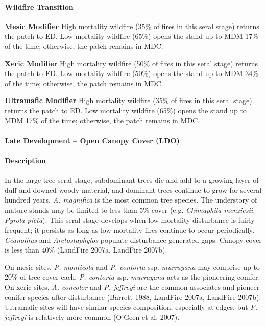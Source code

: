 \paragraph{Wildfire Transition}
\begin{adjustwidth}{2cm}{}
\noindent \textbf{Mesic Modifier } High mortality wildfire (35\% of fires in this seral stage) returns the patch to ED. Low mortality wildfire (65\%) opens the stand up to MDM 17\% of the time; otherwise, the patch remains in MDC. 

\medskip
\noindent \textbf{Xeric Modifier} High mortality wildfire (50\% of fires in this seral stage) returns the patch to ED. Low mortality wildfire (50\%) opens the stand up to MDM 34\% of the time; otherwise, the patch remains in MDC.

\medskip
\noindent \textbf{Ultramafic Modifier} High mortality wildfire (35\% of fires in this seral stage) returns the patch to ED. Low mortality wildfire (65\%) opens the stand up to MDM 17\% of the time; otherwise, the patch remains in MDC.

\end{adjustwidth}

\noindent\hrulefill


\paragraph{Late Development – Open Canopy Cover (LDO)}

\paragraph{Description} In the large tree seral stage, subdominant trees die and add to a growing layer of duff and downed woody material, and dominant trees continue to grow for several hundred years. \emph{A. magnifica} is the most common tree species. The understory of mature stands may be limited to less than 5\% cover (e.g. \emph{Chimaphila menziesii, Pyrola picta}). This seral stage develops when low mortality disturbance is fairly frequent; it persists as long as low mortality fires continue to occur periodically. \emph{Ceanothus} and \emph{Arctostaphylos} populate disturbance-generated gaps. Canopy cover is less than 40\% (LandFire 2007a, LandFire 2007b).

On mesic sites, \emph{P. monticola} and \emph{P. contorta} ssp. \emph{murrayana} may comprise up to 20\% of tree cover each. \emph{P. contorta} ssp. \emph{murrayana} acts as the pioneering conifer. On xeric sites, \emph{A. concolor} and \emph{P. jeffreyi} are the common associates and pioneer conifer species after disturbance (Barrett 1988, LandFire 2007a, LandFire 2007b). Ultramafic sites will have similar species composition, especially at edges, but \emph{P. jeffreyi} is relatively more common (O'Geen et al. 2007).


